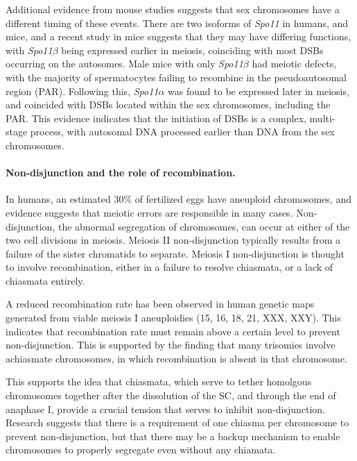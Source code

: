 Additional evidence from mouse studies suggests that sex chromosomes have a different timing of these events.
There are two isoforms of \textit{Spo11} in humans, and mice, and a recent study in mice suggests that they may have differing functions, with \textit{Spo11$\beta$} being expressed earlier in meiosis, coinciding with most DSBs occurring on the autosomes.
Male mice with only \textit{Spo11$\beta$} had meiotic defects, with the majority of spermatocytes failing to recombine in the pseudoautosomal region (PAR)\cite{Kauppi2011}.
Following this, \textit{Spo11$\alpha$} was found to be expressed later in meiosis, and coincided with DSBs located within the sex chromosomes, including the PAR\cite{Kauppi2011,DeMassy2013}.
This evidence indicates that the initiation of DSBs is a complex, multi-stage process, with autosomal DNA processed earlier than DNA from the sex chromosomes.


\paragraph{Non-disjunction and the role of recombination.}
In humans, an estimated 30\% of fertilized eggs have aneuploid chromosomes\cite{Hassold2001}, and evidence suggests that meiotic errors are responsible in many cases.
Non-disjunction, the abnormal segregation of chromosomes, can occur at either of the two cell divisions in meiosis.
Meiosis II non-disjunction typically results from a failure of the sister chromatids to separate.
Meiosis I non-disjunction is thought to involve recombination, either in a failure to resolve chiasmata, or a lack of chiasmata entirely.

A reduced recombination rate has been observed in human genetic maps generated from viable meiosis I aneuploidies (15, 16, 18, 21, XXX, XXY)\cite{Hassold2001,Lynn2004}.
This indicates that recombination rate must remain above a certain level to prevent non-disjunction.
This is supported by the finding that many trisomies involve achiasmate chromosomes, in which recombination is absent in that chromosome\cite{Nagaoka2012}.

This supports the idea that chiasmata, which serve to tether homolgous chromosomes together after the dissolution of the SC, and through the end of anaphase I, provide a crucial tension that serves to inhibit non-disjunction.
Research suggests that there is a requirement of one chiasma per chromosome to prevent non-disjunction, but that there may be a backup mechanism to enable chromosomes to properly segregate even without any chiamata\cite{Fledel-Alon2009}.




